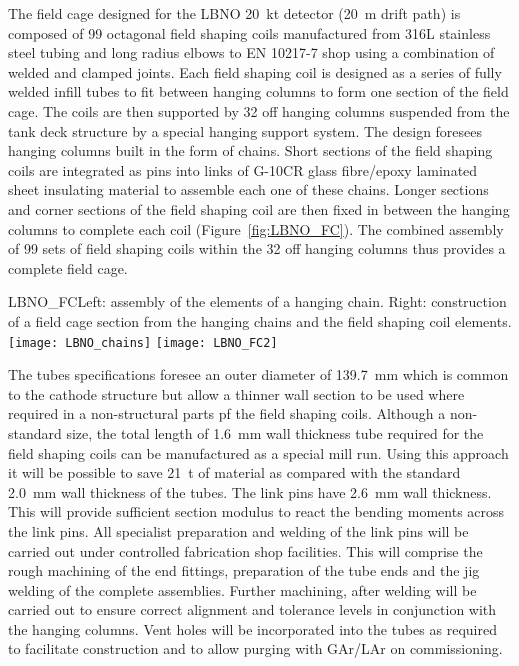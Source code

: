 The field cage designed for the LBNO 20~kt detector (20~m drift
path) is composed of 99 octagonal field shaping coils manufactured
from 316L stainless steel tubing and long radius elbows to EN 10217-7
shop using a combination of welded and clamped joints. Each field
shaping coil is designed as a series of fully welded infill tubes to
fit between hanging columns to form one section of the field cage. The
coils are then supported by 32 off hanging columns suspended from the
tank deck structure by a special hanging support system. The design
foresees hanging columns built in the form of chains. Short sections
of the field shaping coils are integrated as pins into links of G-10CR
glass fibre/epoxy laminated sheet insulating material to assemble each
one of these chains. Longer sections and corner sections of the field
shaping coil are then fixed in between the hanging columns to complete
each coil (Figure~\ref{fig:LBNO_FC}). The combined assembly of 99 sets
of field shaping coils within the 32 off hanging columns thus provides
a complete field cage.
\begin{cdrfigure}{LBNO_FC}{\small Left: assembly of the elements of a hanging chain. Right: construction of a field cage section from the hanging chains and the field shaping coil elements.}
\texttt{[image: LBNO\_chains]} \hfill
\texttt{[image: LBNO\_FC2]}
\end{cdrfigure}

The tubes specifications foresee an outer diameter of 139.7~mm which
is common to the cathode structure but allow a thinner wall section to
be used where required in a non-structural parts pf the field shaping
coils.  Although a non-standard size, the total length of 1.6~mm wall
thickness tube required for the field shaping coils can be
manufactured as a special mill run.  Using this approach it will be
possible to save 21~t of material as compared with the standard
2.0~mm wall thickness of the tubes. The link pins have 2.6~mm wall
thickness. This will provide sufficient section modulus to react the
bending moments across the link pins. All specialist preparation and
welding of the link pins will be carried out under controlled
fabrication shop facilities.  This will comprise the rough machining
of the end fittings, preparation of the tube ends and the jig welding
of the complete assemblies. Further machining, after welding will be
carried out to ensure correct alignment and tolerance levels in
conjunction with the hanging columns.  Vent holes will be incorporated
into the tubes as required to facilitate construction and to allow
purging with GAr/LAr on commissioning.

